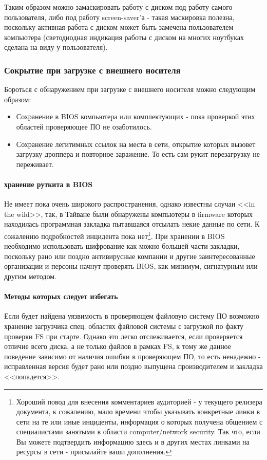 Таким образом можно замаскировать работу с диском под работу самого
пользователя, либо под работу  screen-saver'а - такая маскировка полезна,
поскольку активная работа с диском может быть замечена пользователем компьютера
(светодиодная индикация работы с диском на многих ноутбуках сделана на виду
у пользователя).


\subsubsection{Сокрытие при загрузке с внешнего носителя}

Бороться с обнаружением при загрузке с внешнего носителя можно
следующим образом:

\begin{itemize}
\item{Сохранение в BIOS компьютера или комплектующих - пока проверкой этих областей проверяющее ПО не озаботилось.}
\item{Сохранение легитимных ссылок на места в сети, открытие которых вызовет загрузку дроппера и повторное заражение. То есть сам рукит перезагрузку не переживает.}
\end{itemize}

\paragraph{хранение руткита в BIOS\\}
Не имеет пока очень широкого распространения, однако известны случаи <<in the wild>>, так, в Тайване были
обнаружены компьютеры в firmware которых находилась программная закладка пытавшаяся отсылать некие данные по сети. К сожалению подробностей инцидента пока нет\footnote{Хороший повод для внесения комментариев
аудиторией - у текущего релизера документа, к сожалению, мало времени чтобы указывать конкретные линки в сети на те или иные инциденты, информация о которых получена общением с специалистами занятыми в области computer/network security. Так что, если Вы можете подтвердить информацию здесь и в других местах линками на ресурсы в сети - присылайте ваши дополнения.}. При хранении в BIOS необходимо использовать шифрование как можно
большей части закладки, поскольку рано или поздно антивирусные компании и другие заинтересованные организации и персоны начнут проверять BIOS, как минимум, сигнатурным или другим методом.

\paragraph{Методы которых следует избегать\\}
Если будет найдена уязвимость в проверяющем файловую систему ПО возможно хранение загрузчика спец. областях файловой системы с загрузкой по факту проверки FS при старте. Однако это легко отслеживается, если проверяется отличие всего диска, а не только файлов в рамках FS, к тому же данное поведение зависимо от наличия ошибки в
проверяющем ПО, то есть ненадежно - исправленная версия будет рано или поздно выпущена производителем и закладка <<попадется>>.


